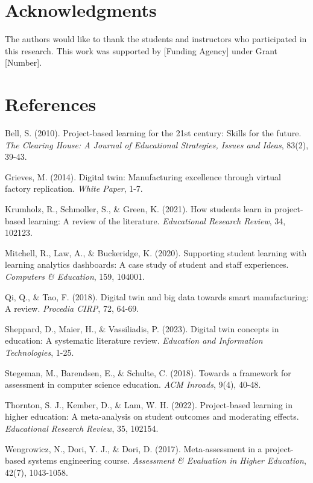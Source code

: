 \documentclass[review]{elsarticle}
\begin{document}
\section*{Acknowledgments}

The authors would like to thank the students and instructors who participated in this research. This work was supported by [Funding Agency] under Grant [Number].

\section*{References}
\label{sec:references}

\begin{thebibliography}{10}

Bell, S. (2010). Project-based learning for the 21st century: Skills for the future. 
\emph{The Clearing House: A Journal of Educational Strategies, Issues and Ideas}, 83(2), 39-43.

Grieves, M. (2014). Digital twin: Manufacturing excellence through virtual factory replication. 
\emph{White Paper}, 1-7.

Krumholz, R., Schmoller, S., \& Green, K. (2021). How students learn in project-based learning: A review of the literature. 
\emph{Educational Research Review}, 34, 102123.

Mitchell, R., Law, A., \& Buckeridge, K. (2020). Supporting student learning with learning analytics dashboards: A case study of student and staff experiences. 
\emph{Computers \& Education}, 159, 104001.

Qi, Q., \& Tao, F. (2018). Digital twin and big data towards smart manufacturing: A review. 
\emph{Procedia CIRP}, 72, 64-69.

Sheppard, D., Maier, H., \& Vassiliadis, P. (2023). Digital twin concepts in education: A systematic literature review. 
\emph{Education and Information Technologies}, 1-25.

Stegeman, M., Barendsen, E., \& Schulte, C. (2018). Towards a framework for assessment in computer science education. 
\emph{ACM Inroads}, 9(4), 40-48.

Thornton, S. J., Kember, D., \& Lam, W. H. (2022). Project-based learning in higher education: A meta-analysis on student outcomes and moderating effects. 
\emph{Educational Research Review}, 35, 102154.

Wengrowicz, N., Dori, Y. J., \& Dori, D. (2017). Meta-assessment in a project-based systems engineering course. 
\emph{Assessment \& Evaluation in Higher Education}, 42(7), 1043-1058.

\end{thebibliography}
\end{document}
